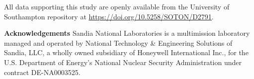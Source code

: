 \documentclass[runningheads]{llncs}
\begin{document}









\vspace{6 pt}
\begin{scriptsize}
	
	\par
	\noindent
	All data supporting this study are openly available from the University of Southampton repository at \url{https://doi.org/10.5258/SOTON/D2791}.\\ 
    \label{public-data}

	\par
	\noindent
	\textbf{Acknowledgements} Sandia National Laboratories is a multimission laboratory managed and operated by National Technology \& Engineering Solutions of Sandia, LLC, a wholly owned subsidiary of Honeywell International Inc., for the U.S. Department of Energy’s National Nuclear Security Administration under contract DE-NA0003525.
	
\end{scriptsize}



\end{document}
